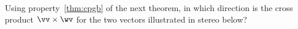 \begin{activity}
Using property~\ref{thm:cpgb} of the next theorem, in which direction is the cross product \(\vv\times\wv\) for the two vectors illustrated in stereo below?
\begin{center}
\end{center}
\actposs[4]{\(-\jv\)}{\(+\iv\)}{\(+\jv\)}{\(-\iv\)}
\end{activity}




